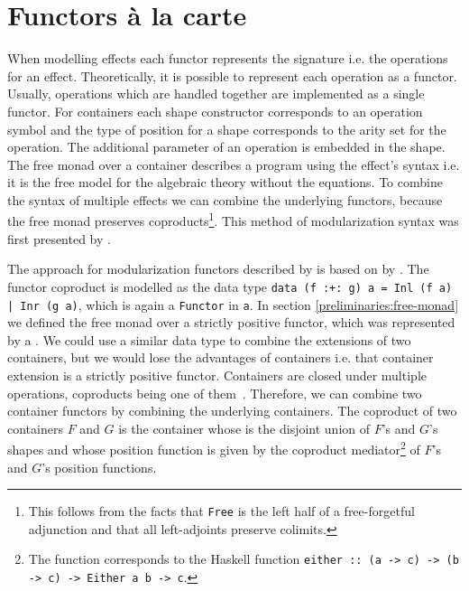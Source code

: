 \section{Functors {\`{a}} la carte}
\label{first-order:functor}

When modelling effects each functor represents the signature i.e. the operations for
an effect.
Theoretically, it is possible to represent each operation as a functor.
Usually, operations which are handled together are implemented as a single functor.
For containers each shape constructor corresponds to an operation symbol and the
type of position for a shape corresponds to the arity set for the operation.
The additional parameter of an operation is embedded in the shape.
The free monad over a container describes a program using the effect's syntax
i.e. it is the free model for the algebraic theory without the equations.
To combine the syntax of multiple effects we can combine the underlying
functors, because the free monad preserves coproducts\footnote{This follows from
the facts that \texttt{Free} is the left half of a free-forgetful adjunction and
that all left-adjoints preserve colimits.}.
This method of modularization syntax was first presented by
\textcite{DBLP:journals/jfp/Swierstra08}.

The approach for modularization functors described by
\textcite{DBLP:conf/haskell/WuSH14} is based on
 by
\textcite{DBLP:journals/jfp/Swierstra08}.
The functor coproduct is modelled as the data type
\texttt{data (f :+: g) a = Inl (f a) | Inr (g a)},
which is again a \texttt{Functor} in \texttt{a}.
In section \ref{preliminaries:free-monad} we defined the free monad over
a strictly positive functor, which was represented by a
.
We could use a similar data type to combine the extensions of two containers,
but we would lose the advantages of containers i.e. that container extension is
a strictly positive functor.
Containers are closed under multiple operations, coproducts being one of
them~\cite{DBLP:conf/fossacs/AbbottAG03}.
Therefore, we can combine two container functors by combining the underlying
containers.
The coproduct of two containers $F$ and $G$ is the container whose
 is the disjoint union of $F$'s and $G$'s shapes and whose
position function  is given by the coproduct
mediator\footnote{The function \AgdaFunction{[\_,\_]} corresponds to the Haskell
function \texttt{either :: (a -> c) -> (b -> c) -> Either a b ->
c}.} of $F$'s and $G$'s position functions.

